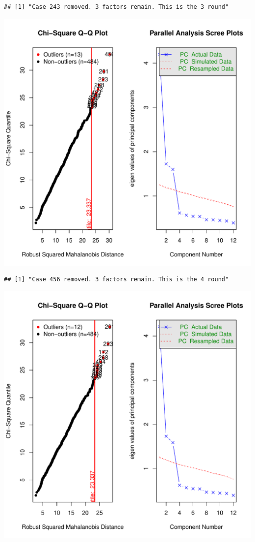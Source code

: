 \documentclass{article}\usepackage[]{graphicx}\usepackage[]{color}
\makeatletter
\def\maxwidth{ %
  \ifdim\Gin@nat@width>\linewidth
    \linewidth
  \else
    \Gin@nat@width
  \fi
}
\newenvironment{kframe}{%
 \def\at@end@of@kframe{}%
 \ifinner\ifhmode%
  \def\at@end@of@kframe{\end{minipage}}%
  \begin{minipage}{\columnwidth}%
 \fi\fi%
 \def\FrameCommand##1{\hskip\@totalleftmargin \hskip-\fboxsep
 \colorbox{shadecolor}{##1}\hskip-\fboxsep
     \hskip-\linewidth \hskip-\@totalleftmargin \hskip\columnwidth}%
 \MakeFramed {\advance\hsize-\width
   \@totalleftmargin\z@ \linewidth\hsize
   \@setminipage}}%
 {\par\unskip\endMakeFramed%
 \at@end@of@kframe}
\newenvironment{knitrout}{}{} %
\makeatother
\begin{document}
\begin{knitrout}
\begin{kframe}\begin{verbatim}
## [1] "Case 243 removed. 3 factors remain. This is the 3 round"
\end{verbatim}
\end{kframe}
\includegraphics[width=\maxwidth]{figure/unnamed-chunk-10-4} 
\begin{kframe}\begin{verbatim}
## [1] "Case 456 removed. 3 factors remain. This is the 4 round"
\end{verbatim}
\end{kframe}
\includegraphics[width=\maxwidth]{figure/unnamed-chunk-10-5} 

\end{knitrout}
\end{document}
